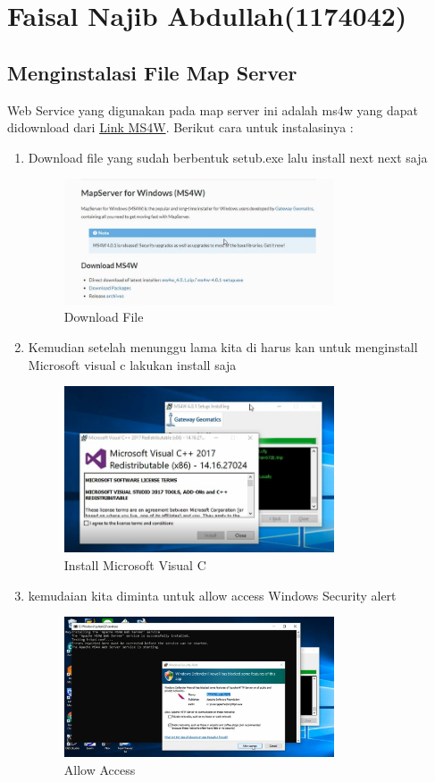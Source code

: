 \section{Faisal Najib Abdullah(1174042)}
\subsection{Menginstalasi File Map Server}
Web Service yang digunakan pada map server ini adalah ms4w yang dapat didownload dari \href{https://ms4w.com/}{Link MS4W}.
Berikut cara untuk instalasinya : 
\begin{enumerate}
    \item Download file yang sudah berbentuk setub.exe lalu install next next saja
    \hfill\break
	\begin{figure}[H]
		\includegraphics[width=8cm]{figures/1174042/T41.JPG}
		\centering
		\caption{Download File}
	\end{figure}
	
    \item Kemudian setelah menunggu lama kita di harus kan untuk menginstall Microsoft visual c lakukan install saja
    \hfill\break
	\begin{figure}[H]
		\includegraphics[width=8cm]{figures/1174042/T42.JPG}
		\centering
		\caption{Install Microsoft Visual C}
	\end{figure}
	
    \item kemudaian kita diminta untuk allow access Windows Security alert
    \hfill\break
	\begin{figure}[H]
		\includegraphics[width=8cm]{figures/1174042/T43.JPG}
		\centering
		\caption{Allow Access}
	\end{figure}
	

\end{enumerate}
